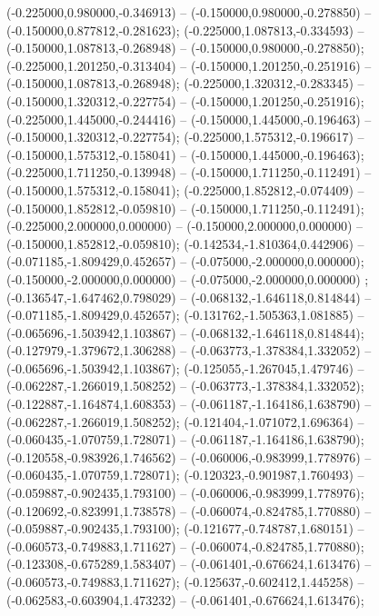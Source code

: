  (-0.225000,0.980000,-0.346913) -- (-0.150000,0.980000,-0.278850) -- (-0.150000,0.877812,-0.281623);
 (-0.225000,1.087813,-0.334593) -- (-0.150000,1.087813,-0.268948) -- (-0.150000,0.980000,-0.278850);
 (-0.225000,1.201250,-0.313404) -- (-0.150000,1.201250,-0.251916) -- (-0.150000,1.087813,-0.268948);
 (-0.225000,1.320312,-0.283345) -- (-0.150000,1.320312,-0.227754) -- (-0.150000,1.201250,-0.251916);
 (-0.225000,1.445000,-0.244416) -- (-0.150000,1.445000,-0.196463) -- (-0.150000,1.320312,-0.227754);
 (-0.225000,1.575312,-0.196617) -- (-0.150000,1.575312,-0.158041) -- (-0.150000,1.445000,-0.196463);
 (-0.225000,1.711250,-0.139948) -- (-0.150000,1.711250,-0.112491) -- (-0.150000,1.575312,-0.158041);
 (-0.225000,1.852812,-0.074409) -- (-0.150000,1.852812,-0.059810) -- (-0.150000,1.711250,-0.112491);
 (-0.225000,2.000000,0.000000) -- (-0.150000,2.000000,0.000000) -- (-0.150000,1.852812,-0.059810);
 (-0.142534,-1.810364,0.442906) -- (-0.071185,-1.809429,0.452657) -- (-0.075000,-2.000000,0.000000);
 (-0.150000,-2.000000,0.000000) -- (-0.075000,-2.000000,0.000000) ;
 (-0.136547,-1.647462,0.798029) -- (-0.068132,-1.646118,0.814844) -- (-0.071185,-1.809429,0.452657);
 (-0.131762,-1.505363,1.081885) -- (-0.065696,-1.503942,1.103867) -- (-0.068132,-1.646118,0.814844);
 (-0.127979,-1.379672,1.306288) -- (-0.063773,-1.378384,1.332052) -- (-0.065696,-1.503942,1.103867);
 (-0.125055,-1.267045,1.479746) -- (-0.062287,-1.266019,1.508252) -- (-0.063773,-1.378384,1.332052);
 (-0.122887,-1.164874,1.608353) -- (-0.061187,-1.164186,1.638790) -- (-0.062287,-1.266019,1.508252);
 (-0.121404,-1.071072,1.696364) -- (-0.060435,-1.070759,1.728071) -- (-0.061187,-1.164186,1.638790);
 (-0.120558,-0.983926,1.746562) -- (-0.060006,-0.983999,1.778976) -- (-0.060435,-1.070759,1.728071);
 (-0.120323,-0.901987,1.760493) -- (-0.059887,-0.902435,1.793100) -- (-0.060006,-0.983999,1.778976);
 (-0.120692,-0.823991,1.738578) -- (-0.060074,-0.824785,1.770880) -- (-0.059887,-0.902435,1.793100);
 (-0.121677,-0.748787,1.680151) -- (-0.060573,-0.749883,1.711627) -- (-0.060074,-0.824785,1.770880);
 (-0.123308,-0.675289,1.583407) -- (-0.061401,-0.676624,1.613476) -- (-0.060573,-0.749883,1.711627);
 (-0.125637,-0.602412,1.445258) -- (-0.062583,-0.603904,1.473232) -- (-0.061401,-0.676624,1.613476);
